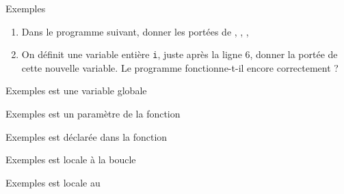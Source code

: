 \documentclass[10pt]{beamer}
\begin{document}
\begin{frame}[fragile]{\Ctitle}{\stitle}
	\begin{exampleblock}{Exemples}
		\begin{enumerate}
		\item<1->Dans le programme suivant, donner les portées de , , , 
		\item<2-> On définit une variable entière {\tt i}, juste après la ligne 6, donner la portée de cette nouvelle variable. Le programme fonctionne-t-il encore correctement ?
		\end{enumerate}
	\end{exampleblock}
\end{frame}

\begin{frame}[fragile]{\Ctitle}{\stitle}
	\begin{exampleblock}{Exemples}
		 est une variable globale
	\end{exampleblock}
\end{frame}

\begin{frame}[fragile]{\Ctitle}{\stitle}
	\begin{exampleblock}{Exemples}
		 est un paramètre de la fonction 
	\end{exampleblock}
\end{frame}

\begin{frame}[fragile]{\Ctitle}{\stitle}
	\begin{exampleblock}{Exemples}
		 est déclarée dans la fonction 
	\end{exampleblock}
\end{frame}

\begin{frame}[fragile]{\Ctitle}{\stitle}
	\begin{exampleblock}{Exemples}
		 est locale à la boucle
	\end{exampleblock}
\end{frame}

\begin{frame}[fragile]{\Ctitle}{\stitle}
	\begin{exampleblock}{Exemples}
		 est locale au 
	\end{exampleblock}
\end{frame}
\end{document}
